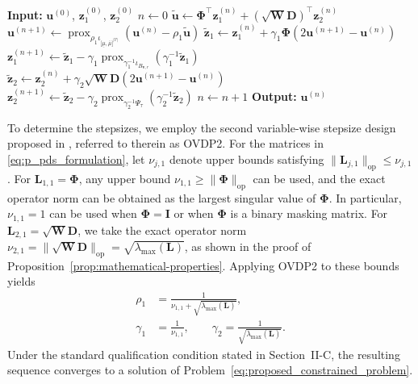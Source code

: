 \begin{algorithm}[t]
\caption{P-PDS-based algorithm for solving
Problem~\eqref{eq:proposed_constrained_problem}}
\label{alg:proposed_algorithm}
\begin{algorithmic}[1]
\STATE \textbf{Input:}
$\mathbf{u}^{(0)}$,
$\mathbf{z}_1^{(0)}$,
$\mathbf{z}_2^{(0)}$
\STATE $n\leftarrow 0$
\STATE
$\widetilde{\mathbf{u}}
\leftarrow
\boldsymbol{\Phi}^{\top}\mathbf{z}_1^{(n)}
+
(\sqrt{\mathbf{W}}\mathbf{D})^{\top}\mathbf{z}_2^{(n)}$
\STATE
$\mathbf{u}^{(n+1)}
\leftarrow
\operatorname{prox}_{
\rho_1
\iota_{\lbrack\underline{\mu},\overline{\mu}\rbrack^{|\mathcal{V}|}}
}
\left(
\mathbf{u}^{(n)}
-
\rho_1\widetilde{\mathbf{u}}
\right)$
\STATE
$\widetilde{\mathbf{z}}_1
\leftarrow
\mathbf{z}_1^{(n)}
+
\gamma_1
\boldsymbol{\Phi}
\left(
2\mathbf{u}^{(n+1)}
-
\mathbf{u}^{(n)}
\right)$
\STATE
$\mathbf{z}_1^{(n+1)}
\leftarrow
\widetilde{\mathbf{z}}_1
-
\gamma_1
\operatorname{prox}_{\gamma_1^{-1}\iota_{B_{\mathbf{v},r}}}
\left(
\gamma_1^{-1}\widetilde{\mathbf{z}}_1
\right)$
\STATE
$\widetilde{\mathbf{z}}_2
\leftarrow
\mathbf{z}_2^{(n)}
+
\gamma_2
\sqrt{\mathbf{W}}\mathbf{D}
\left(
2\mathbf{u}^{(n+1)}
-
\mathbf{u}^{(n)}
\right)$
\STATE
$\mathbf{z}_2^{(n+1)}
\leftarrow
\widetilde{\mathbf{z}}_2
-
\gamma_2
\operatorname{prox}_{\gamma_2^{-1}\Psi_{\tau}}
\left(
\gamma_2^{-1}\widetilde{\mathbf{z}}_2
\right)$
\STATE $n\leftarrow n+1$
\ENDWHILE
\STATE \textbf{Output:} $\mathbf{u}^{(n)}$
\end{algorithmic}
\end{algorithm}

To determine the stepsizes, we employ the second variable-wise stepsize design proposed in \cite{NaganumaOno2023}, referred to therein as OVDP2.
For the matrices in \eqref{eq:p_pds_formulation}, let $\nu_{j,1}$ denote
upper bounds satisfying
$\|\mathbf{L}_{j,1}\|_{\mathrm{op}}\leq\nu_{j,1}$.
For $\mathbf{L}_{1,1}=\boldsymbol{\Phi}$, any upper bound
$\nu_{1,1}\geq\|\boldsymbol{\Phi}\|_{\mathrm{op}}$ can be used, and the
exact operator norm can be obtained as the largest singular value of
$\boldsymbol{\Phi}$.
In particular, $\nu_{1,1}=1$ can be used when
$\boldsymbol{\Phi}=\mathbf{I}$ or when $\boldsymbol{\Phi}$ is a binary
masking matrix.
For $\mathbf{L}_{2,1}=\sqrt{\mathbf{W}}\mathbf{D}$, we take the exact
operator norm
$\nu_{2,1}
=\|\sqrt{\mathbf{W}}\mathbf{D}\|_{\mathrm{op}}
=\sqrt{\lambda_{\max}(\mathbf{L})}$,
as shown in the proof of
Proposition~\ref{prop:mathematical-properties}.
Applying OVDP2 to these bounds yields
\begin{equation}
\begin{aligned}
\rho_1
&=
\frac{1}
{\nu_{1,1}+\sqrt{\lambda_{\max}(\mathbf{L})}},
\\
\gamma_1
&=
\frac{1}{\nu_{1,1}},
\qquad
\gamma_2
=
\frac{1}{\sqrt{\lambda_{\max}(\mathbf{L})}}.
\end{aligned}
\label{eq:stepsizes_proposed}
\end{equation}
Under the standard qualification condition stated in Section~II-C, the resulting sequence converges to a solution of Problem~\eqref{eq:proposed_constrained_problem}.